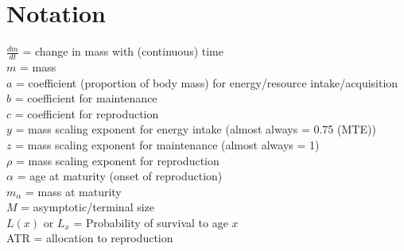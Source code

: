 \documentclass[a4paper]{article} %
\begin{document}
\newpage\section*{Notation}\thispagestyle{empty}
    $\frac{dm}{dt}$ = change in mass with (continuous) time \\
    $m$ = mass \\
    $a$ = coefficient (proportion of body mass) for energy/resource intake/acquisition \\
    $b$ = coefficient for maintenance \\
    $c$ = coefficient for reproduction \\
    $y$ = mass scaling exponent for energy intake (almost always = 0.75 (MTE)) \\
    $z$ = mass scaling exponent for maintenance (almost always = 1) \\
    $\rho$ = mass scaling exponent for reproduction \\
    $\alpha$ = age at maturity (onset of reproduction) \\
    $m_{\alpha}$ = mass at maturity \\
    $M$ = asymptotic/terminal size \\
    $L(x)$ or $L_x$ = Probability of survival to age $x$ \\
    ATR = allocation to reproduction

\newpage
\end{document}
